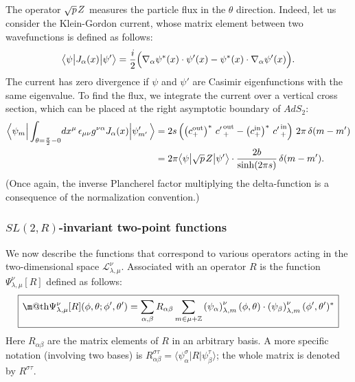 \documentclass[12pt]{article}
\makeatletter
\newcommand*{\wideboxed}[1]{\setlength{\fboxsep}{1ex}%
  \fbox{\m@th$\displaystyle#1$}}
\newcommand{\lt}{\left}
\newcommand{\rt}{\right}
\newcommand{\blangle}{\bigl\langle}
\newcommand{\brangle}{\bigr\rangle}
\newcommand*{\bra}[1]{\langle{#1}|}
\newcommand*{\ket}[1]{|{#1}\rangle}
\newcommand*{\bbra}[1]{\blangle{#1}\big|}
\newcommand*{\bket}[1]{\big|{#1}\brangle}
\newcommand{\calL}{\mathcal{L}}
\newcommand{\ZZ}{\mathbb{Z}}
\newcommand{\RR}{\mathbb{R}}
\DeclareMathOperator{\SL}{SL}
\DeclareMathOperator{\AdS}{AdS}
\newcommand{\IN}{\text{in}}
\newcommand{\OUT}{\text{out}}
\newcommand{\al}{\alpha}
\def\widetilde#1{#1}%
\def\AdS{AdS}
\def\SL{SL}
\def\RR{R}
\makeatother
\begin{document}
The operator $\sqrt{p}\kern1pt Z$ measures the particle flux in the $\theta$ direction. Indeed, let us consider the Klein-Gordon current, whose matrix element between two wavefunctions is defined as follows:
\begin{equation}\label{J_def}
\bbra{\psi}J_{\alpha}(x)\bket{\psi'}
=\frac{i}{2}\Bigl(\nabla_{\alpha}\psi^{*}(x)\cdot\psi'(x)
-\psi^{*}(x)\cdot\nabla_{\alpha}\psi'(x)\Bigr).
\end{equation}
The current has zero divergence if $\psi$ and $\psi'$ are Casimir eigenfunctions with the same eigenvalue. To find the flux, we integrate the current over a vertical cross section, which can be placed at the right asymptotic boundary of $\widetilde{\AdS}_2$:
\begin{equation} \label{fluxop}
\begin{aligned}
\Bigl\langle\psi_m\Big|
\int_{\theta=\frac{\pi}{2}-0}\! dx^{\mu}\,
\epsilon_{\mu\nu}g^{\nu\al}J_{\al}(x)
\Big|\psi'_{m'}\,\Bigr\rangle
&=2s\lt( \lt( c_{+}^{\OUT} \rt)^{*}\,{c'\kern1pt}_{+}^{\OUT}
-\lt( c_{+}^{\IN} \rt)^{*}\,{c'\kern1pt}_{+}^{\IN} \rt)\,2\pi\,\delta(m-m')\\
&=2\pi\bbra{\psi}\sqrt{p}\kern1pt Z\bket{\psi'}\cdot
\frac{2b}{\sinh(2\pi s)}\,\delta(m-m').
\end{aligned}
\end{equation}
(Once again, the inverse Plancherel factor multiplying the delta-function is a consequence of the normalization convention.)

\subsubsection{$\widetilde{\SL}(2,\RR)$-invariant two-point functions} \label{app:twopt}

We now describe the functions that correspond to various operators acting in the two-dimensional space $\calL^{\nu}_{\lambda,\mu}$. Associated with an operator $R$ is the function $\Psi^{\nu}_{\lambda,\mu}[R]$ defined as follows:
\begin{equation}\label{tp_def}
\wideboxed{
\Psi^{\nu}_{\lambda,\mu}[R](\phi,\theta;\phi',\theta')
=\sum_{\alpha,\beta} R_{\alpha\beta} \sum_{m\in\mu+\ZZ}
\lt( \psi_{\alpha} \rt)^{\nu}_{\lambda,m}(\phi,\theta)\cdot
\lt( \psi_{\beta} \rt)^{\nu}_{\lambda,m}(\phi',\theta')^*
}
\end{equation}
Here $R_{\alpha\beta}$ are the matrix elements of $R$ in an arbitrary basis. A more specific notation (involving two bases) is $R^{\sigma\tau}_{\alpha\beta} =\bra{\psi^{\sigma}_{\alpha}}R \ket{\psi^{\tau}_{\beta}}$; the whole matrix is denoted by $R^{\sigma\tau}$.
\end{document}
